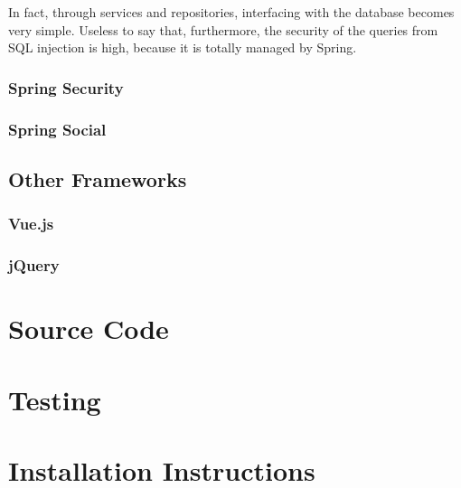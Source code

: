 \documentclass[table, 12pt]{article}
\begin{document}
In fact, through services and repositories, interfacing with the database becomes very simple. Useless to say that, furthermore, the security of the queries from SQL injection is high, because it is totally managed by Spring.

\subsubsection{Spring Security}
\subsubsection{Spring Social}

\subsection{Other Frameworks}
\subsubsection{Vue.js}
\subsubsection{jQuery}

\newpage
\section{Source Code}

\newpage
\section{Testing}

\newpage
\section{Installation Instructions}
\end{document}
